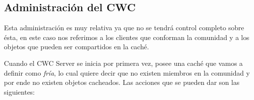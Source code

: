 
\subsection{Administración del CWC}

Esta administración es muy relativa ya que no se tendrá control completo sobre ésta, en este caso nos referimos a los clientes que conforman la comunidad y a los objetos que pueden ser compartidos en la caché.

Cuando el CWC Server se inicia por primera vez, posee una caché que vamos a definir como \textit{fría}, lo cual quiere decir que no existen miembros en la comunidad y por ende no existen objetos cacheados. Las acciones que se pueden dar son las siguientes:

